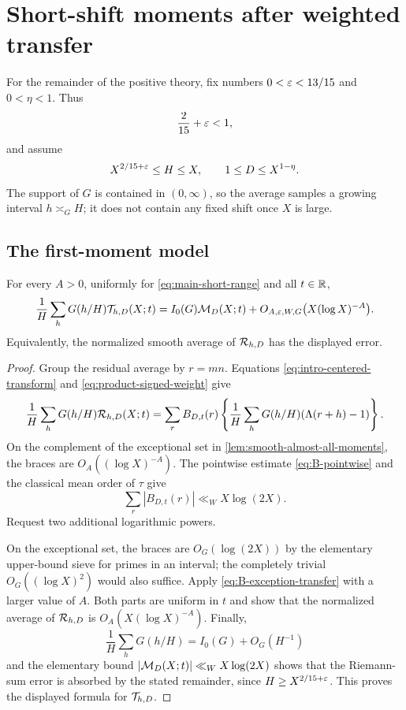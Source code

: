 \section{Short-shift moments after weighted transfer}
\label{sec:short-shift-moments}

For the remainder of the positive theory, fix numbers
$0<\varepsilon<13/15$ and $0<\eta<1$.  Thus
\begin{equation}
 \frac2{15}+\varepsilon<1,
 \label{eq:nonempty-short-range}
\end{equation}
and assume
\begin{equation}
 X^{2/15+\varepsilon}\leq H\leq X,
 \qquad
 1\leq D\leq X^{1-\eta}.
 \label{eq:main-short-range}
\end{equation}
The support of $G$ is contained in $(0,\infty)$, so the average samples a
growing interval $h\asymp_GH$; it does not contain any fixed shift once
$X$ is large.

\subsection{The first-moment model}

\begin{theorem}
\label{thm:short-first-moment}
For every $A>0$, uniformly for \eqref{eq:main-short-range} and all
$t\in\mathbb R$,
\begin{equation}
 \frac1H\sum_hG(h/H)\mathcal T_{h,D}(X;t)
 =I_0(G)\mathcal M_D(X;t)
 +O_{A,\varepsilon,W,G}\bigl(X(\log X)^{-A}\bigr).
 \label{eq:short-first-moment}
\end{equation}
Equivalently, the normalized smooth average of $\mathcal R_{h,D}$ has the
displayed error.
\end{theorem}

\begin{proof}
Group the residual average by $r=mn$.  Equations
\eqref{eq:intro-centered-transform} and
\eqref{eq:product-signed-weight} give
\begin{equation}
 \frac1H\sum_hG(h/H)\mathcal R_{h,D}(X;t)
 =\sum_rB_{D,t}(r)
 \left\{\frac1H\sum_hG(h/H)(\Lambda(r+h)-1)\right\}.
 \label{eq:first-moment-grouped}
\end{equation}
On the complement of the exceptional set in
\cref{lem:smooth-almost-all-moments}, the braces are
$O_A((\log X)^{-A})$.  The pointwise estimate
\eqref{eq:B-pointwise} and the classical mean order of $\tau$ give
\[
 \sum_r|B_{D,t}(r)|\ll_WX\log(2X).
\]
Request two additional logarithmic powers.

On the exceptional set, the braces are $O_G(\log(2X))$ by the elementary
upper-bound sieve for primes in an interval; the completely trivial
$O_G((\log X)^2)$ would also suffice.  Apply
 \eqref{eq:B-exception-transfer} with a larger value of $A$.  Both parts
 are uniform in $t$ and show that the normalized average of
 $\mathcal R_{h,D}$ is $O_A(X(\log X)^{-A})$.  Finally,
 \[
  \frac1H\sum_hG(h/H)=I_0(G)+O_G(H^{-1})
 \]
 and the elementary bound $|\mathcal M_D(X;t)|\ll_WX\log(2X)$ shows that the
 Riemann-sum error is absorbed by the stated remainder, since
 $H\geq X^{2/15+\varepsilon}$.  This proves the displayed formula for
 $\mathcal T_{h,D}$.
\end{proof}

